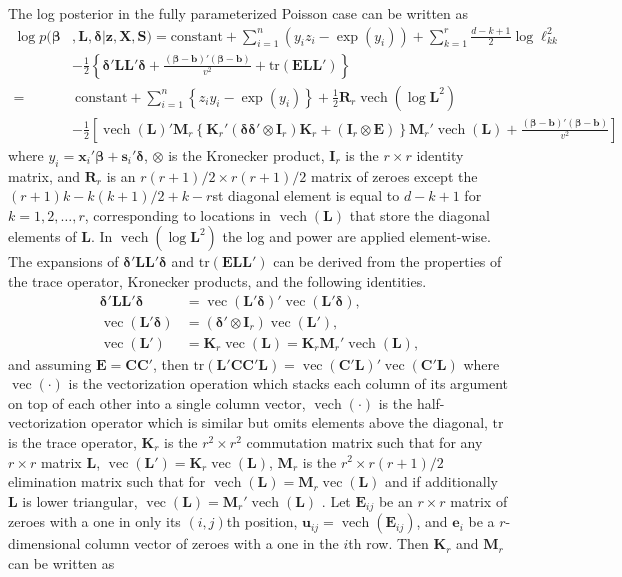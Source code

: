 \documentclass[12pt]{article}
\DeclareMathOperator{\vect}{vec}
\DeclareMathOperator{\vech}{vech}
\begin{document}
The log posterior in the fully parameterized Poisson case can be written as
\begin{align*}
\log p(\bm{\beta}&, \bm{L}, \bm{\delta}|\bm{z}, \bm{X}, \bm{S}) = \mathrm{constant}+ \sum_{i=1}^n\left(y_iz_i - \exp(y_i)\right) + \sum_{k=1}^r \frac{d - k + 1}{2}\log\ell_{kk}^2\\
& - \frac{1}{2}\left\{\bm{\delta}'\bm{L}\bm{L}'\bm{\delta}+\frac{(\bm{\beta} - \bm{b})'(\bm{\beta} - \bm{b})}{v^2} + \mathrm{tr}(\bm{E}\bm{L}\bm{L}')\right\}\\ 
=&\ \mathrm{constant} + \sum_{i=1}^n \left\{z_iy_i - \exp(y_i)\right\} + \frac{1}{2}\bm{R}_r\vech(\log\bm{L}^2)\\
&  -\frac{1}{2}\left[\vech(\bm{L})'\bm{M}_r\left\{\bm{K}_r'(\bm{\delta}\bm{\delta}'\otimes \bm{I}_r)\bm{K}_r + (\bm{I}_r\otimes \bm{E})\right\}\bm{M}_r'\vech(\bm{L})+\frac{(\bm{\beta}-\bm{b})'(\bm{\beta}-\bm{b})}{v^2}\right]
\end{align*}
where $y_i = \bm{x}_i'\bm{\beta} + \bm{s}_i'\bm{\delta}$, $\otimes$ is the Kronecker product, $\bm{I}_r$ is the $r\times r$ identity matrix, and $\bm{R}_r$ is an $r(r+1)/2\times r(r+1)/2$ matrix of zeroes except the $(r + 1)k - k(k+1)/2 + k - r$st diagonal element is equal to $d - k + 1$ for $k=1, 2, \dots, r$, corresponding to locations in $\vech(\bm{L})$ that store the diagonal elements of $\bm{L}$. In $\vech(\log\bm{L}^2)$ the log and power are applied element-wise. The expansions of $\bm{\delta}'\bm{L}\bm{L}'\bm{\delta}$ and $\mathrm{tr}(\bm{E}\bm{L}\bm{L}')$ can be derived from the properties of the trace operator, Kronecker products, and the following identities.
\begin{align*}
\bm{\delta}'\bm{L}\bm{L}'\bm{\delta}& = \vect(\bm{L}'\bm{\delta})'\vect(\bm{L}'\bm{\delta}),\\ 
\vect(\bm{L}'\bm{\delta})& = (\bm{\delta}'\otimes \bm{I}_r)\vect(\bm{L}'),\\
\vect(\bm{L}')& = \bm{K}_r\vect(\bm{L}) = \bm{K}_r\bm{M}_r'\vech(\bm{L}),
\end{align*}
and assuming $\bm{E} = \bm{C}\bm{C}'$, then $\mathrm{tr}(\bm{L'}\bm{C}\bm{C}'\bm{L}) = \vect(\bm{C}'\bm{L})'\vect(\bm{C}'\bm{L})$
where $\vect(\cdot)$ is the vectorization operation which stacks each column of its argument on top of each other into a single column vector, $\vech(\cdot)$ is the half-vectorization operator which is similar but omits elements above the diagonal, $\mathrm{tr}$ is the trace operator, $\bm{K}_r$ is the $r^2\times r^2$ commutation matrix such that for any $r\times r$ matrix $\bm{L}$, $\vect(\bm{L}') = \bm{K}_r\vect(\bm{L})$, $\bm{M}_r$ is the $r^2\times r(r+1)/2$ elimination matrix such that for $\vech(\bm{L}) = \bm{M}_r\vect(\bm{L})$ and if additionally $\bm{L}$ is lower triangular, $\vect(\bm{L}) = \bm{M}_r'\vech(\bm{L})$ \citep{magnus1980elimination,magnus1988linear}. Let $\bm{E}_{ij}$ be an $r\times r$ matrix of zeroes with a one in only its $(i,j)$th position, $\bm{u}_{ij} = \vech(\bm{E}_{ij})$, and $\bm{e}_i$ be a $r$-dimensional column vector of zeroes with a one in the $i$th row. Then $\bm{K}_r$ and $\bm{M}_r$ can be written as
\end{document}
